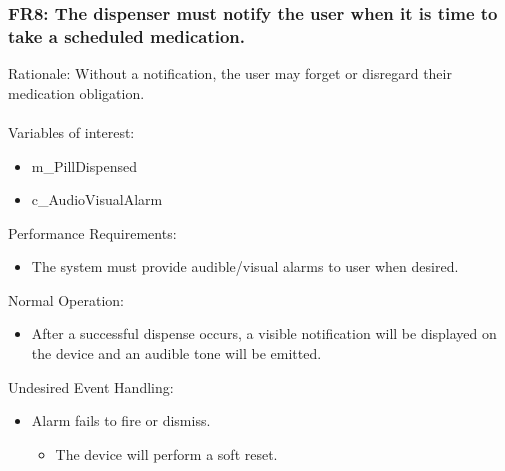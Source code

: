 \documentclass[12pt]{article}
\begin{document}
\subsubsection*{FR8: The dispenser must notify the user when it is time to take a scheduled medication.}
Rationale: Without a notification, the user may forget or disregard their medication obligation.
\\\\
Variables of interest:
\begin{itemize}[noitemsep,topsep=0pt]
    \item m\_PillDispensed
    \item c\_AudioVisualAlarm
\end{itemize} 
\bigskip
Performance Requirements:
\begin{itemize}[noitemsep,topsep=0pt]
    \item The system must provide audible/visual alarms to user when desired.
\end{itemize}
\bigskip
Normal Operation:
\begin{itemize}[noitemsep,topsep=0pt]
    \item After a successful dispense occurs, a visible notification will be displayed on the device and an audible tone will be emitted.
\end{itemize}
\bigskip
Undesired Event Handling:
\begin{itemize}[noitemsep,topsep=0pt]
    \item Alarm fails to fire or dismiss.
    \begin{itemize}
        \item The device will perform a soft reset.
    \end{itemize}
\end{itemize}
\bigskip

\end{document}
